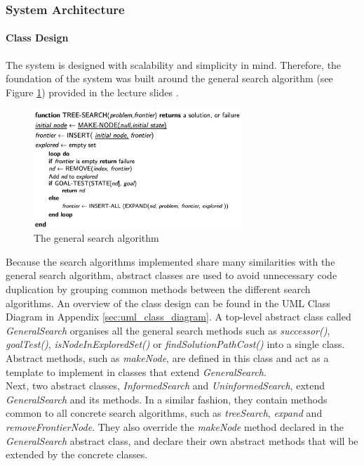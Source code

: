 \documentclass[letterpaper,12pt]{article}
\begin{document}

\subsubsection{System Architecture}

\paragraph{Class Design}

The system is designed with scalability and simplicity in mind. Therefore, the foundation of the system was built around the general search algorithm (see Figure \ref{fig:general_algorithm}) provided in the lecture slides \cite{generalsearchalg}.

\begin{figure}[ht]
\centering
\includegraphics[width=0.7\textwidth]{report/figures/general_search_algorithm.png}
\caption{\label{fig:general_algorithm}The general search algorithm \cite{generalsearchalg}}
\end{figure}

Because the search algorithms implemented share many similarities with the general search algorithm, abstract classes are used to avoid unnecessary code duplication by grouping common methods between the different search algorithms. An overview of the class design can be found in the UML Class Diagram in Appendix \ref{sec:uml_class_diagram}. A top-level abstract class called \textit{GeneralSearch} organises all the general search methods such as \textit{successor()}, \textit{goalTest()}, \textit{isNodeInExploredSet()} or \textit{findSolutionPathCost()} into a single class. Abstract methods, such as \textit{makeNode}, are defined in this class and act as a template to implement in classes that extend \textit{GeneralSearch}.\\

Next, two abstract classes, \textit{InformedSearch} and \textit{UninformedSearch}, extend \textit{GeneralSearch} and its methods. In a similar fashion, they contain methods common to all concrete search algorithms, such as \textit{treeSearch}, \textit{expand} and \textit{removeFrontierNode}. They also override the \textit{makeNode} method declared in the \textit{GeneralSearch} abstract class, and declare their own abstract methods that will be extended by the concrete classes.\\
\end{document}
